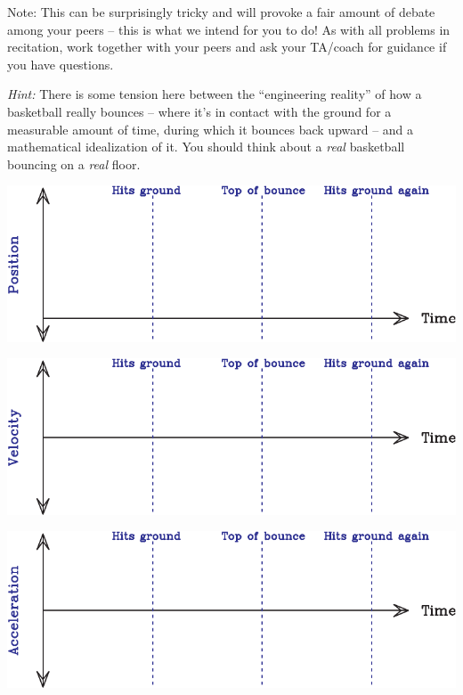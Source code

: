 \documentclass[12pt]{article}
\def\BS{\bigskip}
\begin{document}
\begin{enumerate}
Note: This can be surprisingly tricky and will provoke a fair amount of debate among your peers -- this is what we intend for you to do! As with all problems in recitation, work together with your peers and ask your TA/coach for guidance if you have questions.

\BS\BS

{\it Hint:} There is some tension here between the ``engineering reality'' of how a basketball really bounces -- where it's in contact with the ground for a measurable amount of time, during which it bounces back upward
-- and a mathematical idealization of it. You should think about a {\it real} basketball bouncing on a {\it real} floor.

\newpage


\begin{center}
	\includegraphics[width=\textwidth]{position-crop.pdf}
	
	\vspace{0.4in}
	
	\includegraphics[width=\textwidth]{velocity-crop.pdf}
	
	\vspace{0.4in}
	
	\includegraphics[width=\textwidth]{acceleration-crop.pdf}
\end{center}


\end{enumerate}
\end{document}
